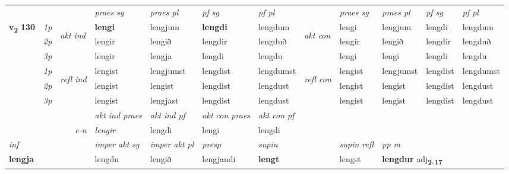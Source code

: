 \begin{longtable}[l]{X>{\footnotesize\itshape}llXXXXlXXXX}
 & &   & \textit{praes sg}  & \textit{praes pl}    & \textit{ pf sg} & \textit{pf pl} & & \textit{praes sg}  & \textit{praes pl}    & \textit{pf sg} & \textit{pf pl }  \\ \cmidrule{4-7} \cmidrule{9-12}
 \multirow{2}{*}{{{\textbf{v{\textsubscript{2}}} \Large{\textbf{130}}}}}  & 1p & \multirow{3}{*}{\begin{turn}{90}\textit{akt ind}\end{turn}} & \textbf{lengi} & lengjum & \textbf{lengdi} & lengdum & \multirow{3}{*}{\begin{turn}{90}\textit{akt con}\end{turn}} &lengi & lengjum & lengdi & lengdum\\*
 & 2p &  &  lengir  & lengið & lengdir & lengduð & & lengir & lengið & lengdir & lengduð \\*
 & 3p &  & lengir & lengja & lengdi & lengdu & & lengi & lengi& lengdi & lengdu \\*
\cmidrule{4-7} \cmidrule{9-12}
 & 1p & \multirow{3}{*}{\begin{turn}{90}\textit{refl ind}\end{turn}}  & lengist & lengjumst & lengdist & lengdumst & \multirow{3}{*}{\begin{turn}{90}\textit{refl con}\end{turn}}  &lengist & lengjumst & lengdist & lengdumst \\*
 & 2p &  & lengist & lengist & lengdist & lengdust & &lengist & lengist & lengdist & lengdust \\*
 & 3p  & & lengist & lengjast & lengdist & lengdust & & lengist & lengist& lengdist & lengdust \\*
\cmidrule{4-7} \cmidrule{9-12}

   && &  \textit{akt ind praes} & \textit{akt ind pf} & \textit{akt con praes} & \textit{akt con pf} \\*
\multicolumn{3}{r}{\textit{e-n}} & lengir & lengdi & lengi & lengdi \\*

\cmidrule{4-7}
   {\textit{inf}} & &  & \textit{imper akt sg} & \textit{imper akt pl}   & \textit{presp} & \textit{supin} && \textit{supin refl} & \textit{pp m} \\*
  {\textbf{lengja}} & && lengdu  & lengið   & lengjandi &  \textbf{lengt} && lengst & \multicolumn{2}{l}{\textbf{lengdur} adj\textbf{\textsubscript{2-17}}} \\*

\midrule


\end{longtable}
